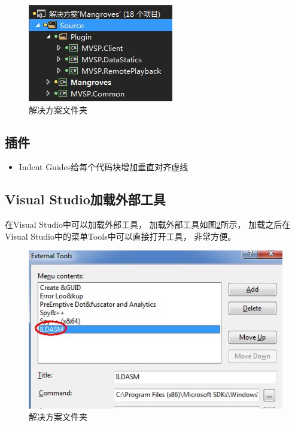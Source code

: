 \documentclass{book}
\begin{document}
\begin{figure}[htbp]
	\centering
	\includegraphics[scale=0.8]{SolutionFolder.jpg}
	\caption{解决方案文件夹}
	\label{fig:SolutionFolder}
\end{figure}

\subsection{插件}

\begin{itemize}
	\item{Indent Guides}给每个代码块增加垂直对齐虚线
\end{itemize}

\subsection{Visual Studio加载外部工具}

在Visual Studio中可以加载外部工具，
加载外部工具如图\ref{fig:VisualStudioAddExternalTools}所示，
加载之后在Visual Studio中的菜单Tools中可以直接打开工具，
非常方便。

\begin{figure}[htbp]
	\centering
	\includegraphics[scale=0.6]{VisualStudioAddExternalTools.jpg}
	\caption{解决方案文件夹}
	\label{fig:VisualStudioAddExternalTools}
\end{figure}
\end{document}
